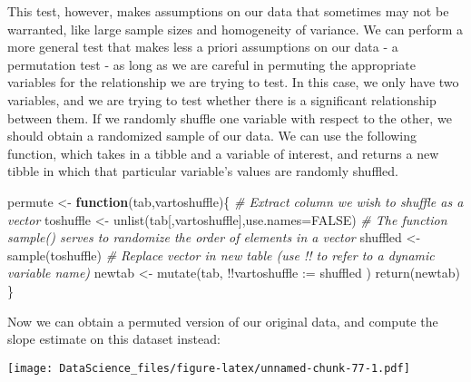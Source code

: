\documentclass[
]{book}
\newenvironment{Shaded}{\begin{snugshade}}{\end{snugshade}}
\newcommand{\AttributeTok}[1]{\textcolor[rgb]{0.77,0.63,0.00}{#1}}
\newcommand{\CommentTok}[1]{\textcolor[rgb]{0.56,0.35,0.01}{\textit{#1}}}
\newcommand{\ConstantTok}[1]{\textcolor[rgb]{0.00,0.00,0.00}{#1}}
\newcommand{\ControlFlowTok}[1]{\textcolor[rgb]{0.13,0.29,0.53}{\textbf{#1}}}
\newcommand{\FunctionTok}[1]{\textcolor[rgb]{0.00,0.00,0.00}{#1}}
\newcommand{\NormalTok}[1]{#1}
\newcommand{\OtherTok}[1]{\textcolor[rgb]{0.56,0.35,0.01}{#1}}
\newcommand{\SpecialCharTok}[1]{\textcolor[rgb]{0.00,0.00,0.00}{#1}}
\newcommand{\StringTok}[1]{\textcolor[rgb]{0.31,0.60,0.02}{#1}}
\begin{document}
This test, however, makes assumptions on our data that sometimes may not be warranted, like large sample sizes and homogeneity of variance. We can perform a more general test that makes less a priori assumptions on our data - a permutation test - as long as we are careful in permuting the appropriate variables for the relationship we are trying to test. In this case, we only have two variables, and we are trying to test whether there is a significant relationship between them. If we randomly shuffle one variable with respect to the other, we should obtain a randomized sample of our data. We can use the following function, which takes in a tibble and a variable of interest, and returns a new tibble in which that particular variable's values are randomly shuffled.

\begin{Shaded}
\begin{Highlighting}[]
\NormalTok{permute }\OtherTok{\textless{}{-}} \ControlFlowTok{function}\NormalTok{(tab,vartoshuffle)\{}
  \CommentTok{\# Extract column we wish to shuffle as a vector}
\NormalTok{  toshuffle }\OtherTok{\textless{}{-}} \FunctionTok{unlist}\NormalTok{(tab[,vartoshuffle],}\AttributeTok{use.names=}\ConstantTok{FALSE}\NormalTok{)}
  \CommentTok{\# The function sample() serves to randomize the order of elements in a vector}
\NormalTok{  shuffled }\OtherTok{\textless{}{-}} \FunctionTok{sample}\NormalTok{(toshuffle)}
  \CommentTok{\# Replace vector in new table (use !! to refer to a dynamic variable name)}
\NormalTok{  newtab }\OtherTok{\textless{}{-}} \FunctionTok{mutate}\NormalTok{(tab, }\SpecialCharTok{!!}\AttributeTok{vartoshuffle :=}\NormalTok{ shuffled )}
  \FunctionTok{return}\NormalTok{(newtab)}
\NormalTok{\}}
\end{Highlighting}
\end{Shaded}

Now we can obtain a permuted version of our original data, and compute the slope estimate on this dataset instead:

\begin{Shaded}
\end{Shaded}

\texttt{[image: DataScience\_files/figure-latex/unnamed-chunk-77-1.pdf]}
\end{document}
